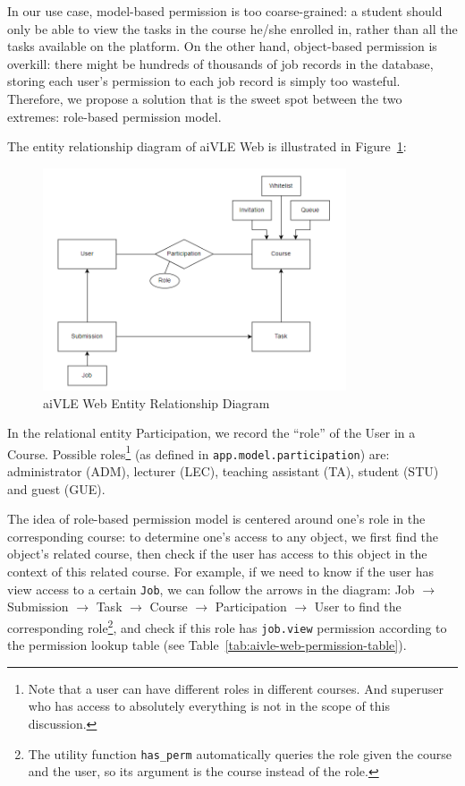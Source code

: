 In our use case, model-based permission is too coarse-grained: a student should only be able to view the tasks in the course he/she enrolled in, rather than all the tasks available on the platform. On the other hand, object-based permission is overkill: there might be hundreds of thousands of job records in the database, storing each user's permission to each job record is simply too wasteful. Therefore, we propose a solution that is the sweet spot between the two extremes: role-based permission model.

The entity relationship diagram of aiVLE Web is illustrated in Figure~\ref{fig:aivle-web-er-diagram}:
\begin{figure}[H]
    \centering
    \includegraphics[width=0.8\textwidth]{images/aivle-web-er-diagram.png}
    \caption{aiVLE Web Entity Relationship Diagram}
    \label{fig:aivle-web-er-diagram}
\end{figure}

In the relational entity Participation, we record the ``role'' of the User in a Course. Possible roles\footnote{Note that a user can have different roles in different courses. And superuser who has access to absolutely everything is not in the scope of this discussion.} (as defined in \texttt{app.model.participation}) are: administrator (ADM), lecturer (LEC), teaching assistant (TA), student (STU) and guest (GUE).

The idea of role-based permission model is centered around one's role in the corresponding course: to determine one's access to any object, we first find the object's related course, then check if the user has access to this object in the context of this related course. For example, if we need to know if the user has view access to a certain \texttt{Job}, we can follow the arrows in the diagram: Job $\to$ Submission $\to$ Task $\to$ Course $\to$ Participation $\to$ User to find the corresponding role\footnote{The utility function \texttt{has\_perm} automatically queries the role given the course and the user, so its argument is the course instead of the role.}, and check if this role has \texttt{job.view} permission according to the permission lookup table (see Table~\ref{tab:aivle-web-permission-table}).

